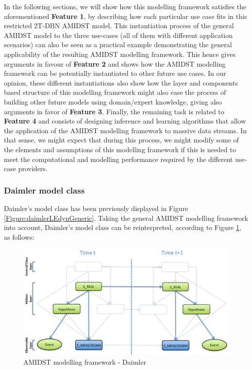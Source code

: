 In the following sections, we will show how this modelling framework satisfies the aforementioned \textbf{Feature 1}, by describing how each particular use case fits in this restricted 2T-DBN AMIDST model. This instantiation process of the general AMIDST model to the three use-cases (all of them with different application scenarios) can also be seen as a practical example demonstrating the general applicability of the resulting AMIDST modelling framework. This hence gives arguments in favour of \textbf{Feature 2} and shows how the AMIDST modelling framework can be potentially instantiated to other future use cases. In our opinion, these different instantiations also show how the layer and components based structure of this modelling framework  might also ease the process of building other future models using domain/expert knowledge, giving also arguments in favor of \textbf{Feature 3}. Finally, the remaining task is related to \textbf{Feature 4} and consists of designing inference and learning algorithms that allow the application of the AMIDST modelling framework to massive data streams. In that sense, we might expect that during this process, we might modify some of the elements and assumptions of this modelling framework if this is needed to meet the computational and modelling performance required by the different use-case providers. 



\subsubsection{Daimler model class}\label{daimlerAMIDSTModels}


Daimler's model class has been previously displayed in Figure \ref{Figure:daimlerLEdynGeneric}. Taking the general AMIDST modelling framework into account, Daimler's model class can be reinterpreted, according to Figure \ref{Figure:AMIDSTModelClassDaimler}, as follows:

\begin{figure}[ht!]
\begin{center}
\includegraphics[scale=0.39]{./figures/AMIDSTModelClassDaimler}
\caption{\label{Figure:AMIDSTModelClassDaimler} AMIDST modelling framework - Daimler}
\end{center}
\end{figure}

